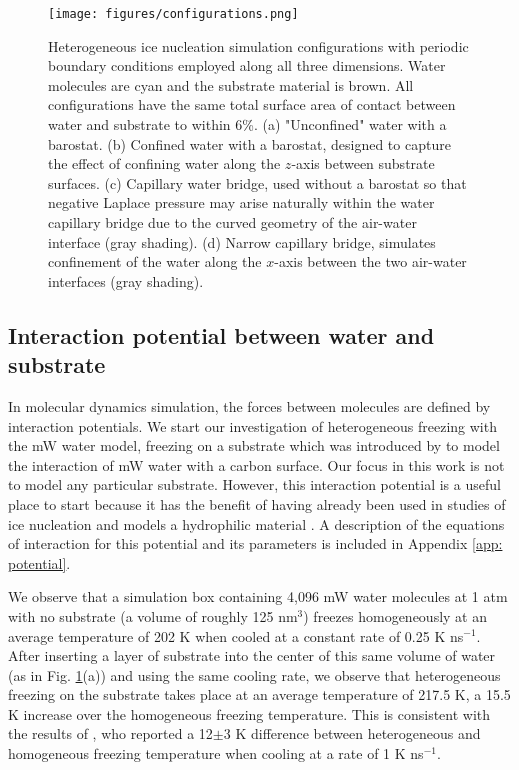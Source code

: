 \documentclass[journal abbreviation, manuscript]{copernicus}
\begin{document}
\begin{figure}[t]
\texttt{[image: figures/configurations.png]}
\caption{\label{fig:configurations} Heterogeneous ice nucleation simulation configurations with periodic boundary conditions employed along all three dimensions. Water molecules are cyan and the substrate material is brown. All configurations have the same total surface area of contact between water and substrate to within 6\%. (a) "Unconfined" water with a barostat. (b) Confined water with a barostat, designed to capture the effect of confining water along the $z$-axis between substrate surfaces. (c) Capillary water bridge, used without a barostat so that negative Laplace pressure may arise naturally within the water capillary bridge due to the curved geometry of the air-water interface (gray shading). (d) Narrow capillary bridge, simulates confinement of the water along the $x$-axis between the two air-water interfaces (gray shading).}
\end{figure}



\subsection{Interaction potential between water and substrate}

In molecular dynamics simulation, the forces between molecules are defined by interaction potentials. We start our investigation of heterogeneous freezing with the mW water model, freezing on a substrate which was introduced by \citet{lupi2014} to model the interaction of mW water with a carbon surface. Our focus in this work is not to model any particular substrate. However, this interaction potential is a useful place to start because it has the benefit of having already been used in studies of ice nucleation and models a hydrophilic material \citep{lupi2014, Bi2016}. A description of the equations of interaction for this potential and its parameters is included in Appendix \ref{app: potential}.

We observe that a simulation box containing 4,096 mW water molecules at 1 atm with no substrate (a volume of roughly 125 nm$^3$) freezes homogeneously at an average temperature of 202 K when cooled at a constant rate of 0.25 K ns$^{-1}$. After inserting a layer of substrate into the center of this same volume of water (as in Fig. \ref{fig:configurations}(a)) and using the same cooling rate, we observe that heterogeneous freezing on the substrate takes place at an average temperature of 217.5 K, a 15.5 K increase over the homogeneous freezing temperature. This is consistent with the results of \citet{lupi2014}, who reported a 12$\pm$3 K difference between heterogeneous and homogeneous freezing temperature when cooling at a rate of 1 K ns$^{-1}$.
\end{document}
